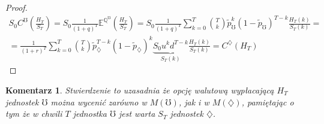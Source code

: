 \documentclass[11pt]{report}
\newtheorem{koment}{Komentarz}[chapter]
\begin{document}
\begin{proof}
\begin{multline*}
S_0 C^{\mho}\left( \frac{H_T}{S_T} \right) = S_0 \frac{1}{(1+q)^T} \mathbb{E}^{\mathbb{Q}^{\mho}} \left( \frac{H_T}{S_T} \right) = S_0 \frac{1}{(1+q)^T} \sum_{k=0}^{T} {{T}\choose{k}} \tilde{p}_{\mho}^{k} (1-\tilde{p}_{\mho})^{T-k} \frac{H_T(k)}{S_T(k)} = \\ =\frac{1}{(1+r)^T} \sum_{k=0}^{T} {{T}\choose{k}} \tilde{p}_{\diamondsuit}^{T-k} (1-\tilde{p}_{\diamondsuit})^{k} \underbrace{S_0 u^{k} d^{T-k}}_{S_T(k)} \frac{H_T(k)}{S_T(k)} = C^{\diamondsuit}(H_T)
\end{multline*}
\end{proof}


\begin{koment}
Stwierdzenie to uzasadnia że opcję walutową wypłacającą $H_T$ jednostek $\mho$ można wycenić zarówno w $M(\mho)$, jak i w $M(\diamondsuit)$, pamiętając o tym że w chwili $T$ jednostka $\mho$ jest warta $S_T$ jednostek $\diamondsuit$.
\end{koment} 
 
\end{document}
